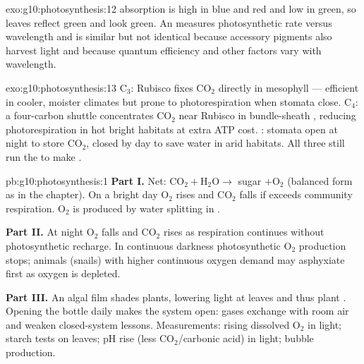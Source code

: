 \begin{solution}{exo:g10:photosynthesis:12}
 absorption is high in blue and red and low in green, so leaves
reflect green and look green. An  measures photosynthetic rate
versus wavelength and is similar but not identical because accessory pigments
also harvest light and because quantum efficiency and other factors vary with
wavelength.
\end{solution}

\begin{solution}{exo:g10:photosynthesis:13}
C$_3$: Rubisco fixes $\mathrm{CO_2}$ directly in mesophyll --- efficient in
cooler, moister climates but prone to photorespiration when stomata close.
C$_4$: a four-carbon shuttle concentrates $\mathrm{CO_2}$ near Rubisco in
bundle-sheath , reducing photorespiration in hot bright habitats at
extra ATP cost. : stomata open at night to store $\mathrm{CO_2}$, closed by
day to save water in arid habitats. All three still run the  to
make .
\end{solution}

\begin{solution}{pb:g10:photosynthesis:1}
\textbf{Part I.} Net: $\mathrm{CO_2}+\mathrm{H_2O}\to$ sugar $+
\mathrm{O_2}$ (balanced form as in the chapter). On a bright day
$\mathrm{O_2}$ rises and $\mathrm{CO_2}$ falls if  exceeds
community respiration. $\mathrm{O_2}$ is produced by water splitting in
.

\textbf{Part II.} At night $\mathrm{O_2}$ falls and $\mathrm{CO_2}$ rises as
respiration continues without photosynthetic recharge. In continuous darkness
photosynthetic $\mathrm{O_2}$ production stops; animals (snails) with higher
continuous oxygen demand may asphyxiate first as oxygen is depleted.

\textbf{Part III.} An algal film shades plants, lowering light at leaves and
thus plant . Opening the bottle daily makes the system open:
gases exchange with room air and weaken closed-system lessons. Measurements:
rising dissolved $\mathrm{O_2}$ in light; starch tests on leaves; pH rise
(less $\mathrm{CO_2}$/carbonic acid) in light; bubble production.
\end{solution}
